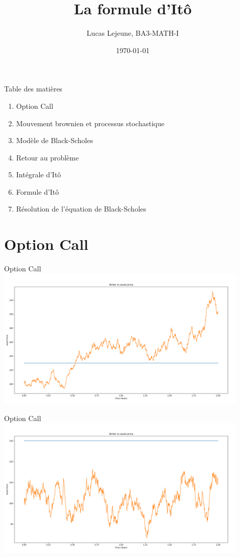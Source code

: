 \documentclass{beamer}
\title{La formule d'Itô}
\date{\today}
\author{Lucas Lejeune, BA3-MATH-I}
\newcommand{\1}{\mathmybb{1}}
\begin{document}
\frame{\titlepage}

\begin{frame}{Table des matières}
  \begin{enumerate}
    \item Option Call
    \item Mouvement brownien et processus stochastique
    \item Modèle de Black-Scholes
    \item Retour au problème
    \item Intégrale d'Itô
    \item Formule d'Itô
    \item Résolution de l'équation de Black-Scholes
  \end{enumerate}
\end{frame}
\section{Option Call}
\begin{frame}{Option Call}
  \includegraphics[width=12cm]{imgs/strike.png}
\end{frame}
\begin{frame}{Option Call}
  \includegraphics[width=12cm]{imgs/nostrike.png}
\end{frame}
\end{document}
